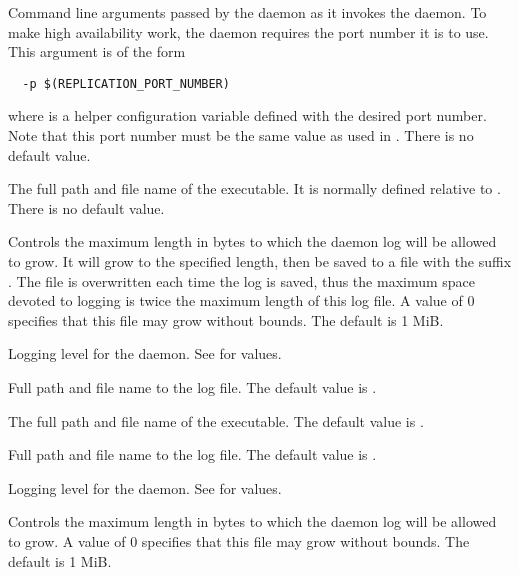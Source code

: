 \begin{description}
\label{param:ReplicationArgs}
\item[\Macro{REPLICATION\_ARGS}]
  Command line arguments passed by the  daemon
  as it invokes the  daemon.
  To make high availability work, the  daemon
  requires the port number it is to use.
  This argument is of the form
  \begin{verbatim}
  -p $(REPLICATION_PORT_NUMBER)
  \end{verbatim}
  where  is a helper configuration
  variable defined with the desired port number.
  Note that this port number must be the same value as
  used in .
  There is no default value.

\label{param:Replication}
\item[\Macro{REPLICATION}]
  The full path and file name of the  executable.
  It is normally defined relative to .
  There is no default value.

\label{param:MaxReplicationLog}
\item[\Macro{MAX\_REPLICATION\_LOG}]
  Controls the maximum length in bytes to which the 
  daemon log will be allowed to grow. It will grow to the specified length,
  then be saved to a file with the suffix .
  The   file is overwritten each time the log is saved,
  thus the maximum space devoted to logging is twice the maximum length
  of this log file.
  A value of 0 specifies that this file may grow without bounds.
  The default is 1 MiB.

\label{param:ReplicationDebug}
\item[\Macro{REPLICATION\_DEBUG}]
  Logging level for the  daemon.
  See  for values.

\label{param:ReplicationLog}
\item[\Macro{REPLICATION\_LOG}]
  Full path and file name to the log file.
  The default value is .

\label{param:Transferer}
\item[\Macro{TRANSFERER}]
  The full path and file name of the  executable.
  The default value is .

\label{param:TransfererLog}
\item[\Macro{TRANSFERER\_LOG}]
  Full path and file name to the log file.
  The default value is .

\label{param:TransfererDebug}
\item[\Macro{TRANSFERER\_DEBUG}]
  Logging level for the  daemon.
  See  for values.

\label{param:MaxTransfererLog}
\item[\Macro{MAX\_TRANSFERER\_LOG}]
  Controls the maximum length in bytes to which the 
  daemon log will be allowed to grow.
  A value of 0 specifies that this file may grow without bounds.
  The default is 1 MiB.

\end{description}

